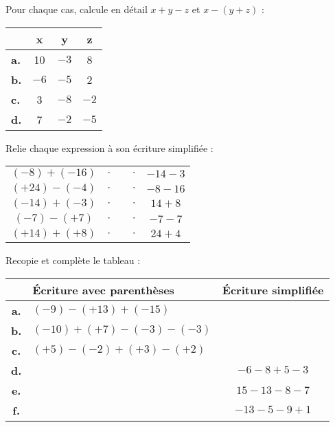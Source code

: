 \begin{exercice}
Pour chaque cas, calcule en détail $x + y - z$ et $x - (y + z)$ :
\begin{center}
\begin{tabularx}{0.4\linewidth}{|X|c|c|c|}
\hline
 & x & y & z \\ \hline
\textbf{a.} & 10 & $-3$ & 8 \\ \hline
\textbf{b.} & $-6$ & $-5$ & 2 \\ \hline
\textbf{c.} & 3 & $-8$ & $-2$ \\ \hline
\textbf{d.} & 7 & $-2$ & $-5$ \\ \hline
 \end{tabularx}
 \end{center}
\end{exercice}




\begin{exercice}
Relie chaque expression à son écriture simplifiée :
\begin{center}
 \begin{tabularx}{0.8\linewidth}{|cc|X|cc|}
  \cline{1-2}\cline{4-5}
  $(-8) + (-16)$ & $\cdot$ & & $\cdot$ & $-14 - 3$ \\ \cline{1-2}\cline{4-5}
  $(+24) - (-4)$ & $\cdot$ & & $\cdot$ & $-8 - 16$ \\ \cline{1-2}\cline{4-5}
  $(-14) + (-3)$ & $\cdot$ & & $\cdot$ & $14 + 8$ \\ \cline{1-2}\cline{4-5}
  $(-7) - (+7)$ & $\cdot$ & & $\cdot$ & $-7 - 7$ \\ \cline{1-2}\cline{4-5}
  $(+14) + (+8)$ & $\cdot$ & & $\cdot$ & $24 + 4$ \\ \cline{1-2}\cline{4-5}
  \end{tabularx}
  \end{center}
\end{exercice}


\begin{exercice}
Recopie et complète le tableau :
\begin{center}
\begin{tabularx}{1.04\linewidth}{|c|X|c|}
\hline
 & Écriture avec parenthèses & Écriture simplifiée \\ \hline
\textbf{a.} & \small{$(-9) - (+13) + (-15)$} & \\ \hline
\textbf{b.} & \small{$(-10) + (+7) - (-3) - (-3)$} & \\ \hline
\textbf{c.} & \small{$(+5) - (-2) + (+3) - (+2)$} & \\ \hline
\textbf{d.} & & \small{$-6 - 8 + 5 - 3$} \\ \hline
\textbf{e.} & & \small{$15 - 13 - 8 - 7$} \\ \hline
\textbf{f.} & & \small{$-13 - 5 - 9 + 1$} \\ \hline
 \end{tabularx}
 \end{center}
\end{exercice}


